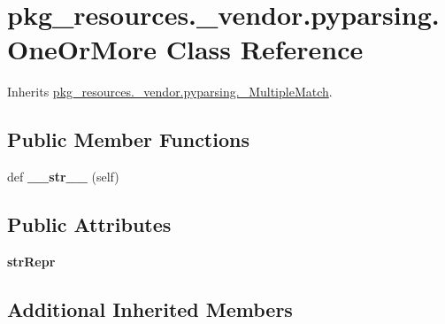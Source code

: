 \hypertarget{classpkg__resources_1_1__vendor_1_1pyparsing_1_1_one_or_more}{}\section{pkg\+\_\+resources.\+\_\+vendor.\+pyparsing.\+One\+Or\+More Class Reference}
\label{classpkg__resources_1_1__vendor_1_1pyparsing_1_1_one_or_more}


Inherits \hyperlink{classpkg__resources_1_1__vendor_1_1pyparsing_1_1___multiple_match}{pkg\+\_\+resources.\+\_\+vendor.\+pyparsing.\+\_\+\+Multiple\+Match}.

\subsection*{Public Member Functions}
\begin{DoxyCompactItemize}
\item 
\mbox{\label{classpkg__resources_1_1__vendor_1_1pyparsing_1_1_one_or_more_a6703409265c6f2920420b9776f322756}} 
def {\bfseries \+\_\+\+\_\+str\+\_\+\+\_\+} (self)
\end{DoxyCompactItemize}
\subsection*{Public Attributes}
\begin{DoxyCompactItemize}
\item 
\mbox{\label{classpkg__resources_1_1__vendor_1_1pyparsing_1_1_one_or_more_a23ad994bcaa63fcd8995c1a550ffceab}} 
{\bfseries str\+Repr}
\end{DoxyCompactItemize}
\subsection*{Additional Inherited Members}


